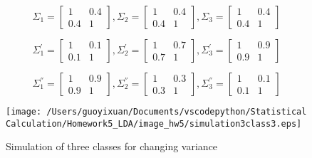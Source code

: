 \begin{itemize}
$$ \Sigma_1 = \left[
            \begin{array}{clr}
                1 & 0.4  \\
                0.4 & 1
            \end{array} \right] ,
            \Sigma_2 = \left[
            \begin{array}{clr}
                1 & 0.4  \\
                0.4 & 1 
            \end{array} \right]  ,
            \Sigma_3 = \left[
            \begin{array}{clr}
                1 & 0.4  \\
                0.4 & 1 
            \end{array} \right] $$

$$ \Sigma_1^{'} = \left[
            \begin{array}{clr}
                1 & 0.1  \\
                0.1 & 1
            \end{array} \right] ,
            \Sigma_2^{'} = \left[
            \begin{array}{clr}
                1 & 0.7  \\
                0.7 & 1 
            \end{array} \right]  ,
            \Sigma_3^{'} = \left[
            \begin{array}{clr}
                1 & 0.9  \\
                0.9 & 1 
            \end{array} \right] $$

$$ \Sigma_1^{''} = \left[
            \begin{array}{clr}
                1 & 0.9  \\
                0.9 & 1
            \end{array} \right] ,
            \Sigma_2^{''} = \left[
            \begin{array}{clr}
                1 & 0.3  \\
                0.3 & 1 
            \end{array} \right]  ,
            \Sigma_3^{''} = \left[
            \begin{array}{clr}
                1 & 0.1  \\
                0.1 & 1 
            \end{array} \right] $$
            
            
\begin{figure}[H]
    \centering
        \texttt{[image: /Users/guoyixuan/Documents/vscodepython/Statistical Calculation/Homework5\_LDA/image\_hw5/simulation3class3.eps]}
    \caption{Simulation of three classes for changing variance}
    \label{fig:variance 3 class}
\end{figure} 


\end{itemize}
